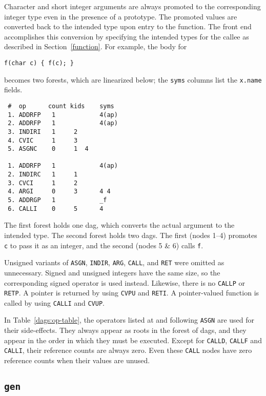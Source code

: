 Character and short integer arguments are always promoted to the
corresponding integer type even in the presence of a prototype.
The promoted values are converted back to the intended
type upon entry to the function. The front end accomplishes
this conversion by specifying the intended types for the callee
as described in Section~\ref{function}. 
For example, the body for
\begin{verbatim}
f(char c) { f(c); }
\end{verbatim}
becomes two forests, which are linearized below;
the \verb|syms| columns list the \verb|x.name| fields.
\begin{verbatim}
 #  op      count kids    syms
 1. ADDRFP   1            4(ap)
 2. ADDRFP   1            4(ap)
 3. INDIRI   1     2                                    
 4. CVIC     1     3                                    
 5. ASGNC    0     1  4                                 
                                  
 1. ADDRFP   1            4(ap)
 2. INDIRC   1     1                                    
 3. CVCI     1     2                                    
 4. ARGI     0     3      4 4                           
 5. ADDRGP   1            _f                             
 6. CALLI    0     5      4                             
\end{verbatim}
The first forest holds one dag, which converts the actual argument to the
intended type.  The second forest holds two dags.
The first (nodes 1--4) promotes \verb|c| to pass it as an integer,
and the second (nodes 5 \& 6) calls \verb|f|.

Unsigned variants of \verb|ASGN|, \verb|INDIR|, \verb|ARG|,
\verb|CALL|, and \verb|RET| were omitted as unnecessary.  Signed and
unsigned integers have the same size, so the corresponding signed
operator is used instead.  Likewise, there is no \verb|CALLP| or
\verb|RETP|. A pointer is returned by using \verb|CVPU| and
\verb|RETI|. A pointer-valued function is called by using \verb|CALLI|
and \verb|CVUP|.

In Table~\ref{dags:op-table}, the operators listed at and following \verb|ASGN|
are used for their side-effects. They always appear as roots in the
forest of dags, and they appear in the order in which they must be executed.
Except for \verb|CALLD|, \verb|CALLF| and \verb|CALLI|, their reference
counts are always zero.  Even these \verb|CALL| nodes have zero
reference counts when their values are unused.

\subsection{\tt gen}

